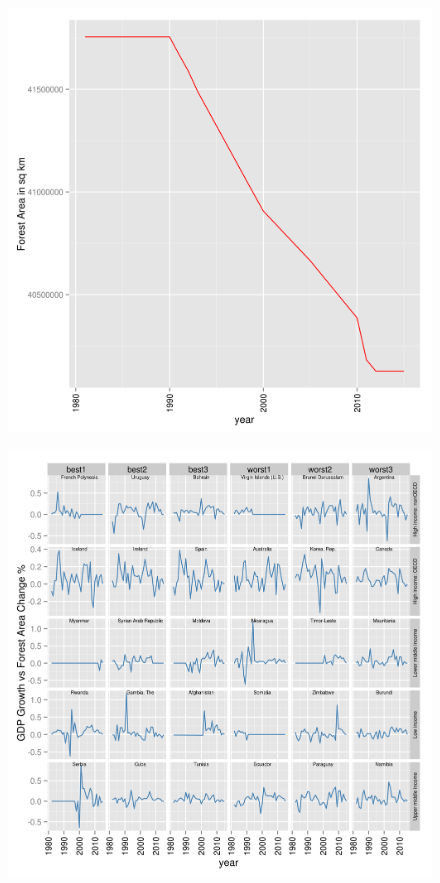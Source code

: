 \documentclass{article}
\begin{document}
\begin{figure}[h]
\includegraphics[scale=0.8]{forest_total_by_year.png}
\end{figure}
\pagebreak
\begin{figure}[h]
\includegraphics[scale=0.8]{gdp_by_income.png}
\end{figure}
\end{document}
